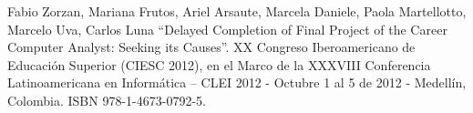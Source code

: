 \begin{thebibliography}{10}
Fabio Zorzan, Mariana Frutos, Ariel Arsaute, Marcela Daniele, Paola Martellotto, Marcelo Uva, Carlos Luna “Delayed Completion of Final Project of the Career Computer Analyst: Seeking its Causes”. XX Congreso Iberoamericano de Educación Superior (CIESC 2012), en el Marco de la XXXVIII Conferencia Latinoamericana en Informática – CLEI 2012 - Octubre 1 al 5 de 2012 - Medellín, Colombia. ISBN 978-1-4673-0792-5.



\end{thebibliography}

